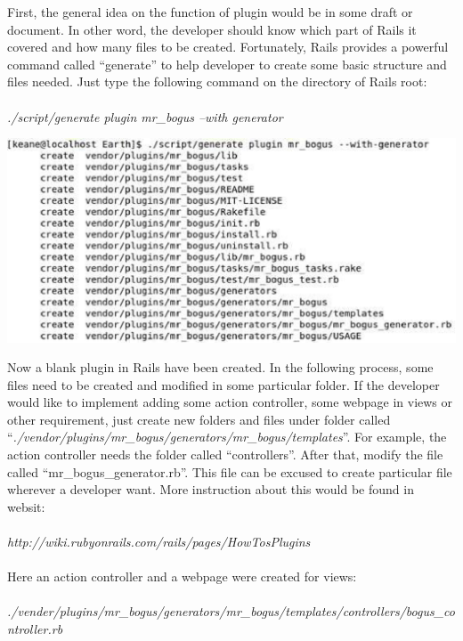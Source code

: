\documentclass[10pt,oneside]{article}
\begin{document}
First, the general idea on the function of plugin would be in some draft or document. In other word, the developer should know which part of Rails it covered and how many files to be created. Fortunately, Rails provides a powerful command called “generate” to help developer to create some basic structure and files needed. Just type the following command on the directory of Rails root:\\
\\
\textit{./script/generate plugin mr\_bogus –with generator}\\
\begin{center}
 \includegraphics[width=150mm]{fig/instruction-2.eps}\\
\end{center}
Now a blank plugin in Rails have been created. In the following process, some files need to be created and modified in some particular folder. If the developer would like to implement adding some action controller, some webpage in views or other requirement, just create new folders and files under folder called “\textit{./vendor/plugins/mr\_bogus/generators/mr\_bogus/templates}”. For example, the action controller needs the folder called “controllers”. After that, modify the file called “mr\_bogus\_generator.rb”. This file can be excused to create particular file wherever a developer want. More instruction about this would be found in websit:\\ 
\\
\textit{http://wiki.rubyonrails.com/rails/pages/HowTosPlugins}\\
\\
Here an action controller and a webpage were created for views:\\
\\
\textit{./vender/plugins/mr\_bogus/generators/mr\_bogus/templates/controllers/bogus\_controller.rb}\\
\end{document}
